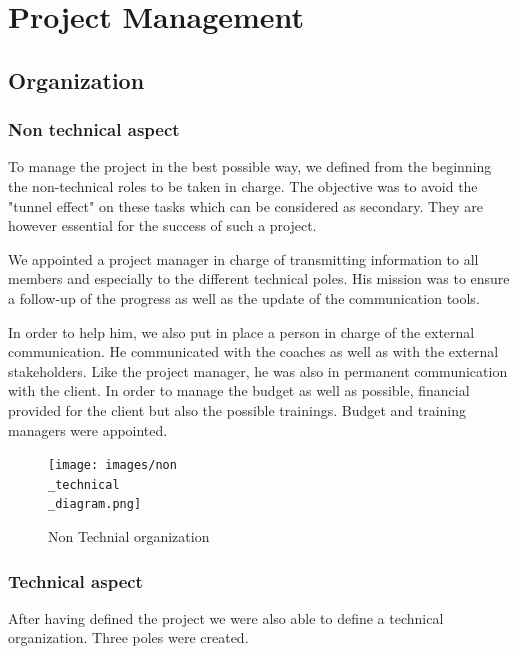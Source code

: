 \section{Project Management}
\subsection{Organization}
\subsubsection{Non technical aspect}

\hspace{\parindent} To manage the project in the best possible way, we defined from the beginning the non-technical roles to be taken in charge. The objective was to avoid the "tunnel effect" on these tasks which can be considered as secondary. They are however essential for the success of such a project. 

\bigbreak

We appointed a project manager in charge of transmitting information to all members and especially to the different technical poles. His mission was to ensure a follow-up of the progress as well as the update of the communication tools. 

\bigbreak

In order to help him, we also put in place a person in charge of the external communication. He communicated with the coaches as well as with the external stakeholders. Like the project manager, he was also in permanent communication with the client. In order to manage the budget as well as possible, financial provided for the client but also the possible trainings. Budget and training managers were appointed. 

\begin{figure}[ht]
    \centering
    \texttt{[image: images/non\\\_technical\\\_diagram.png]}
    \caption{Non Technial organization}
    \label{fig:mesh2}
\end{figure}

\subsubsection{Technical aspect}

\hspace{\parindent} After having defined the project we were also able to define a technical organization. Three poles were created. 

